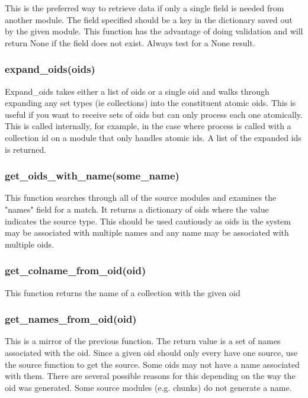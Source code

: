 \documentclass{book}
\begin{document}
This is the preferred way to retrieve data if only a single field is needed from another module.  The field specified should be a key in the dictionary saved out by the given module.  This function has the advantage of doing validation and will return None if the field does not exist.  Always test for a None result.
             
\subsubsection{expand\_oids(oids)}

Expand\_oids takes either a list of oids or a single oid and walks through expanding any set types (ie collections) into the constituent atomic oids.  This is useful if you want to receive sets of oids but can only process each one atomically.  This is called internally, for example, in the case where process is called with a collection id on a module that only handles atomic ids.  A list of the expanded ids is returned.

\subsubsection{get\_oids\_with\_name(some\_name)}

This function searches through all of the source modules and examines the "names" field for a match.  It returns a dictionary of oids where the value indicates the source type.  This should be used cautiously as oids in the system may be associated with multiple names and any name may be associated with multiple oids.
    
\subsubsection{get\_colname\_from\_oid(oid)}

This function returns the name of a collection with the given oid

\subsubsection{get\_names\_from\_oid(oid)}

This is a mirror of the previous function.  The return value is a set of names associated with the oid.  Since a given oid should only every have one source, use the source function to get the source.  Some oids may not have a name associated with them.  There are several possible reasons for this depending on the way the oid was generated.  Some source modules (e.g. chunks) do not generate a name. 
\end{document}
